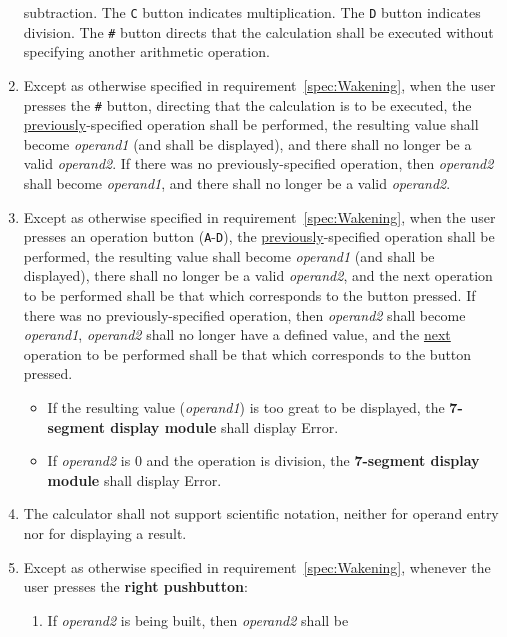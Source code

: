 \begin{enumerate}
    subtraction. The \texttt{C} button indicates multiplication. The \texttt{D}
    button indicates division. The \texttt{\#} button directs that the
    calculation shall be executed without specifying another arithmetic
    operation.
\item Except as otherwise specified in requirement~\ref{spec:Wakening}, when
    the user presses the \texttt{\#} button, directing that the calculation is
    to be executed, the \underline{previously}-specified operation shall be
    performed, the resulting value shall become \textit{operand1} (and shall be
    displayed), and there shall no longer be a valid \textit{operand2}. If
    there was no previously-specified operation, then \textit{operand2} shall
    become \textit{operand1}, and there shall no longer be a valid
    \textit{operand2}.
\item Except as otherwise specified in requirement~\ref{spec:Wakening}, when
    the user presses an operation button (\texttt{A}-\texttt{D}), the
    \underline{previously}-specified operation shall be performed, the
    resulting value shall become \textit{operand1} (and shall be displayed),
    there shall no longer be a valid \textit{operand2}, and the next operation
    to be performed shall be that which corresponds to the button pressed. If
    there was no previously-specified operation, then \textit{operand2} shall
    become \textit{operand1}, \textit{operand2} shall no longer have a defined
    value, and the \underline{next} operation to be performed shall be that
    which corresponds to the button pressed.
    \begin{itemize}
    \item If the resulting value (\textit{operand1}) is too great to be
        displayed, the \textbf{7-segment display module} shall display
        {\dviiseg Error}.
    \item If \textit{operand2} is 0 and the operation is division, the
        \textbf{7-segment display module} shall display {\dviiseg Error}.
    \end{itemize}
\item The calculator shall not support scientific notation, neither for operand
    entry nor for displaying a result.
\item Except as otherwise specified in requirement~\ref{spec:Wakening},
    whenever the user presses the \textbf{right pushbutton}:
    \begin{enumerate}
    \item If \textit{operand2} is being built, then \textit{operand2} shall be

\end{enumerate}
\end{enumerate}
